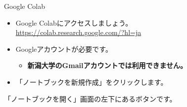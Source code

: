 \documentclass[12pt,aspectratio=43]{beamer}
\begin{document}
\begin{frame}[t]{Google Colab}
  \setlength{\parskip}{0pt}
  \begin{itemize}
    \setlength{\itemsep}{3mm}
    \item Google Colabにアクセスしましょう。\\
      {\small\url{https://colab.research.google.com/?hl=ja}}
    \item Googleアカウントが必要です。
      \begin{itemize}
        \item \textcolor{red!75!black}{\textbf{新潟大学のGmailアカウントでは利用できません。}}
      \end{itemize}
    \item 「ノートブックを新規作成」をクリックします。
  \end{itemize}
  \vspace{3mm}
  \begingroup\centering
    \par
    \vspace{1mm}
    {\small 「ノートブックを開く」画面の左下にあるボタンです。\par}
  \endgroup
\end{frame}
\end{document}
